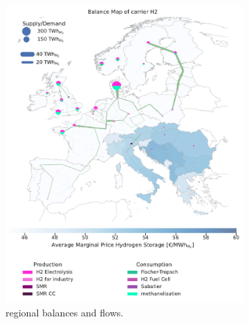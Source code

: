 \documentclass[10pt]{article}
\begin{document}
\begin{figure}[h!]
    \centering
    \begin{subfigure}[t]{0.495\textwidth} %
        \vspace{0pt}
        \includegraphics[width=\textwidth]{balance_map_h2} %
        \caption{ regional balances and flows.}
        \label{fig:balance_map_h2}
    \end{subfigure}
    \hfill
    \begin{subfigure}[t]{0.495\textwidth} %
        \vspace{0pt}

\end{subfigure}
\end{figure}
\end{document}
